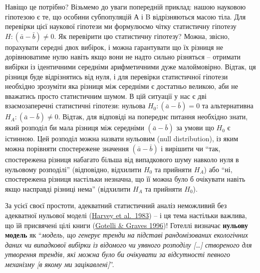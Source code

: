 \documentclass[
  11pt,
]{book}
\begin{document}
Навіщо це потрібно? Візьмемо до уваги попередній приклад: нашою науковою гіпотезою є те, що особини субпопуляцій А і B відрізняються масою тіла. Для перевірки цієї наукової гіпотези ми формулюємо чітку статистичну гіпотезу \(H: (\bar{a} - \bar{b}) \neq 0\). Як перевірити цю статистичну гіпотезу? Можна, звісно, порахувати середні двох вибірок, і можна гарантувати що їх різниця не дорівнюватиме нулю навіть якщо вони не надто сильно різняться -- отримати вибірки із ідентичними середніми арифметичними дуже малоймовірно. Відтак, ця різниця буде відрізнятись від нуля, і для перевірки статистичної гіпотези необхідно зрозуміти яка різниця між середніми є достатньо великою, аби не вважатись просто статистичним шумом. В цій ситуації у нас є дві взаємозаперечні статистичні гіпотези: нульова \(H_0: (\bar{a} - \bar{b}) = 0\) та альтернативна \(H_A: (\bar{a} - \bar{b}) \neq 0\). Відтак, для відповіді на попереднє питання необхідно знати, який розподіл би мала різниця між середніми \((\bar{a} - \bar{b})\) за умови що \(H_0\) є істинною. Цей розподіл можна назвати нульовим (null distribution), із яким можна порівняти спостережене значення \((\bar{a} - \bar{b})\) і вирішити чи ``так, спостережена різниця набагато більша від випадкового шуму навколо нуля в нульовому розподілі'' (відповідно, відхилити \(H_0\) та прийняти \(H_A\)) або ``ні, спостережена різниця настільки незначна, що її можна було б очікувати навіть якщо насправді різниці нема'' (відхилити \(H_A\) та прийняти \(H_0\)).

За усієї своєї простоти, адекватний статистичний аналіз неможливий без адекватної нульової моделі (\href{https://www.jstor.org/stable/2096971}{Harvey et al.~1983}) -- і ця тема настільки важлива, що їй присвячені цілі книги (\href{https://www.uvm.edu/~ngotelli/nullmodelspage.html}{Gotelli \& Graves 1996})! Готеллі визначає \textbf{нульову модель} як ``\emph{модель, що генерує тренди на підставі рандомізованих екологічних даних чи випадкової вибірки із відомого чи уявного розподілу {[}\ldots{]} створеного для утворення трендів, які можна було би очікувати за відсутності певного механізму {[}в якому ми зацікавлені{]}}''.
\end{document}
